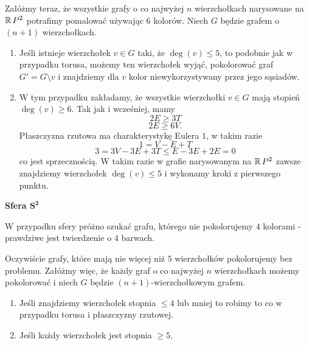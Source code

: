 \begin{enumerate}[label=\textbf{(\alph*)}]
    Załóżmy teraz, że wszystkie grafy o co najwyżej $n$ wierzchołkach narysowane na $\operatorname{\mathbb{R}} P^2$ potrafimy pomalować używając $6$ kolorów. Niech $G$ będzie grafem o $(n+1)$ wierzchołkach. 
    \begin{enumerate}[label=\arabic*.]
      \item Jeśli istnieje wierzchołek $v\in G$ taki, że $\deg(v)\leq 5$, to podobnie jak w przypadku torusa, możemy ten wierzchołek wyjąć, pokolorować graf $G'=G\setminus v$ i znajdziemy dla $v$ kolor niewykorzystywany przez jego sąsiadów.
      \item W tym przypadku zakładamy, że wszystkie wierzchołki $v\in G$ mają stopień $\deg(v)\geq 6$. Tak jak i wcześniej, mamy
        $$2E\geq 3T$$
        $$2E\geq 6V.$$
        Płaszczyzna rzutowa ma charakterystykę Eulera $1$, w takim razie
        $$1=V-E+T$$
        $$3=3V-3E+3T\leq E-3E+2E=0$$
        co jest sprzecznością. W takim razie w grafie narysowanym na $\operatorname{\mathbb{R}} P^2$ zawsze znajdziemy wierzchołek $\deg(v)\leq 5$ i wykonamy kroki z pierwszego punktu.
    \end{enumerate}
%
%
    \textbf{Sfera $\mathbf{S^2}$} \dotfill

    W przypadku sfery próżno szukać grafu, którego nie pokolorujemy $4$ kolorami - prawdziwe jest twierdzenie o $4$ barwach.

    Oczywiście grafy, które mają nie więcej niż $5$ wierzchołków pokolorujemy bez problemu. Załóżmy więc, że każdy graf o co najwyżej $n$ wierzchołkach możemy pokolorować i niech $G$ będzie $(n+1)$-wierzchołkowym grafem.

    \begin{enumerate}[label=\arabic*]
      \item Jeśli znajdziemy wierzchołek stopnia $\leq 4$ lub mniej to robimy to co w przypadku torusa i płaszczyzny rzutowej.
      \item Jeśli każdy wierzchołek jest stopnia $\geq 5$.
    \end{enumerate}


\end{enumerate}
